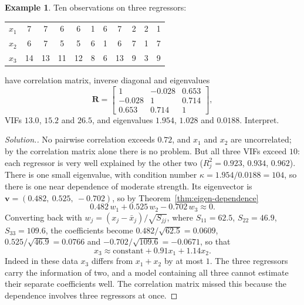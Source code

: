 \documentclass[11pt,a4paper]{article}
\numberwithin{equation}{section}
\theoremstyle{definition}
\newtheorem{exa}[thm]{Example}
\newenvironment{solution}
  {\renewcommand{\qedsymbol}{}\begin{proof}[\textit{Solution}.]}
  {\end{proof}}
\begin{document}
\begin{exa}\label{exa:three-way}
Ten observations on three regressors:
\begin{center}
\begin{tabular}{l|cccccccccc}
$x_1$ & 7 & 7 & 6 & 6 & 1 & 6 & 7 & 2 & 2 & 1 \\
$x_2$ & 6 & 7 & 5 & 5 & 6 & 1 & 6 & 7 & 1 & 7 \\
$x_3$ & 14 & 13 & 11 & 12 & 8 & 6 & 13 & 9 & 3 & 9 \\
\end{tabular}
\end{center}
have correlation matrix, inverse diagonal and eigenvalues
\[
\mathbf{R} = \begin{bmatrix} 1 & -0.028 & 0.653 \\ -0.028 & 1 & 0.714 \\ 0.653 & 0.714 & 1 \end{bmatrix} ,
\]
VIFs $13.0$, $15.2$ and $26.5$, and eigenvalues $1.954$, $1.028$ and $0.0188$.
Interpret.
\end{exa}

\begin{solution}
No pairwise correlation exceeds $0.72$, and $x_1$ and $x_2$ are uncorrelated; by the correlation matrix
alone there is no problem. But all three VIFs exceed $10$: each regressor is very well explained by
the other two ($R_j^2 = 0.923$, $0.934$, $0.962$). There is one small eigenvalue, with condition number
$\kappa = 1.954/0.0188 = 104$, so there is one near dependence of moderate strength. Its eigenvector is
$\mathbf{v} = (0.482,\ 0.525,\ -0.702)$, so by Theorem~\ref{thm:eigen-dependence}
\[
0.482\,w_1 + 0.525\,w_2 - 0.702\,w_3 \approx 0 .
\]
Converting back with $w_j = (x_j - \bar x_j)/\sqrt{S_{jj}}$, where $S_{11} = 62.5$, $S_{22} = 46.9$,
$S_{33} = 109.6$, the coefficients become $0.482/\sqrt{62.5} = 0.0609$, $0.525/\sqrt{46.9} = 0.0766$ and
$-0.702/\sqrt{109.6} = -0.0671$, so that
\[
x_3 \approx \text{constant} + 0.91x_1 + 1.14x_2 .
\]
Indeed in these data $x_3$ differs from $x_1 + x_2$ by at most $1$. The three regressors carry the
information of two, and a model containing all three cannot estimate their separate coefficients
well. The correlation matrix missed this because the dependence involves three regressors at once.
\end{solution}
\end{document}
